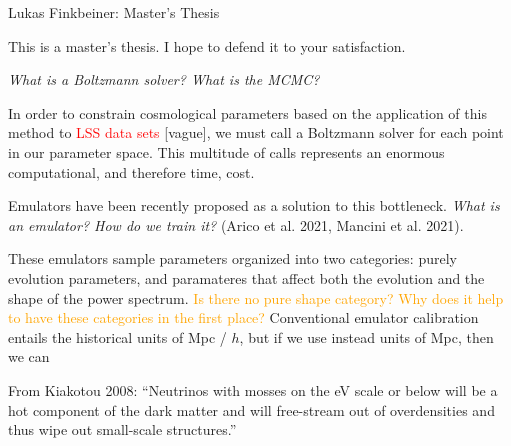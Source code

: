 \documentclass[11pt]{article}
\begin{document}
\fontsize{12}{15}

\begin{center}
Lukas Finkbeiner: Master's Thesis
\end{center}

This is a master's thesis. I hope to defend it to your satisfaction.

\textit{What is a Boltzmann solver? What is the MCMC?}

In order to constrain cosmological parameters based on the application of this method to \textcolor{red}{LSS data sets} [vague], we must call a Boltzmann solver for each point in our parameter space. This multitude of calls represents an enormous computational, and therefore time, cost.

Emulators have been recently proposed as a solution to this bottleneck. \textit{What is an emulator? How do we train it?} (Arico et al. 2021, Mancini et al. 2021).

These emulators sample parameters organized into two categories: purely evolution parameters, and paramateres that affect both the evolution and the shape of the power spectrum. \textcolor{orange}{Is there no pure shape category? Why does it help to have these categories in the first place?} Conventional emulator calibration entails the historical units of Mpc / $h$, but if we use instead units of Mpc, then we can 

From Kiakotou 2008: ``Neutrinos with mosses on the eV scale or below will be a hot component of the dark matter and will free-stream out of overdensities and thus wipe out small-scale structures.''
\end{document}
